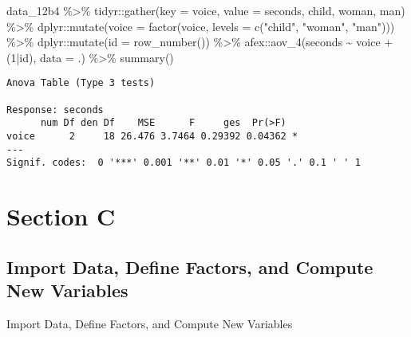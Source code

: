 \documentclass[
]{article}
\newenvironment{Shaded}{\begin{snugshade}}{\end{snugshade}}
\newcommand{\AttributeTok}[1]{\textcolor[rgb]{0.77,0.63,0.00}{#1}}
\newcommand{\DecValTok}[1]{\textcolor[rgb]{0.00,0.00,0.81}{#1}}
\newcommand{\FunctionTok}[1]{\textcolor[rgb]{0.00,0.00,0.00}{#1}}
\newcommand{\NormalTok}[1]{#1}
\newcommand{\SpecialCharTok}[1]{\textcolor[rgb]{0.00,0.00,0.00}{#1}}
\newcommand{\StringTok}[1]{\textcolor[rgb]{0.31,0.60,0.02}{#1}}
\begin{document}
\begin{Shaded}
\begin{Highlighting}[]
\NormalTok{data\_12b4 }\SpecialCharTok{\%\textgreater{}\%} 
\NormalTok{  tidyr}\SpecialCharTok{::}\FunctionTok{gather}\NormalTok{(}\AttributeTok{key =}\NormalTok{ voice,}
                \AttributeTok{value =}\NormalTok{ seconds,}
\NormalTok{                child, woman, man) }\SpecialCharTok{\%\textgreater{}\%} 
\NormalTok{  dplyr}\SpecialCharTok{::}\FunctionTok{mutate}\NormalTok{(}\AttributeTok{voice =} \FunctionTok{factor}\NormalTok{(voice,}
                               \AttributeTok{levels =} \FunctionTok{c}\NormalTok{(}\StringTok{"child"}\NormalTok{, }\StringTok{"woman"}\NormalTok{, }\StringTok{"man"}\NormalTok{))) }\SpecialCharTok{\%\textgreater{}\%} 
\NormalTok{  dplyr}\SpecialCharTok{::}\FunctionTok{mutate}\NormalTok{(}\AttributeTok{id =} \FunctionTok{row\_number}\NormalTok{()) }\SpecialCharTok{\%\textgreater{}\%} 
\NormalTok{  afex}\SpecialCharTok{::}\FunctionTok{aov\_4}\NormalTok{(seconds }\SpecialCharTok{\textasciitilde{}}\NormalTok{ voice }\SpecialCharTok{+}\NormalTok{ (}\DecValTok{1}\SpecialCharTok{|}\NormalTok{id),}
              \AttributeTok{data =}\NormalTok{ .) }\SpecialCharTok{\%\textgreater{}\%} 
  \FunctionTok{summary}\NormalTok{()}
\end{Highlighting}
\end{Shaded}

\begin{verbatim}
Anova Table (Type 3 tests)

Response: seconds
      num Df den Df    MSE      F     ges  Pr(>F)  
voice      2     18 26.476 3.7464 0.29392 0.04362 *
---
Signif. codes:  0 '***' 0.001 '**' 0.01 '*' 0.05 '.' 0.1 ' ' 1
\end{verbatim}

\clearpage

\hypertarget{section-c}{%
\section{Section C}\label{section-c}}

\hypertarget{import-data-define-factors-and-compute-new-variables}{%
\subsection{Import Data, Define Factors, and Compute New
Variables}\label{import-data-define-factors-and-compute-new-variables}}

Import Data, Define Factors, and Compute New Variables
\end{document}
